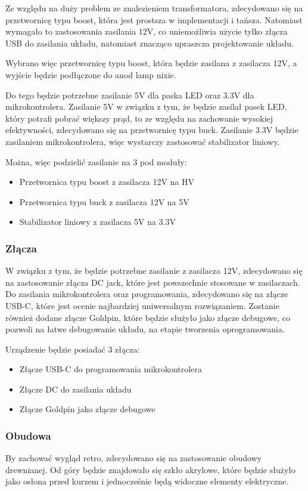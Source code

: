\documentclass[../main.tex]{subfiles}
\begin{document}
Ze względu na duży problem ze znalezieniem transformatora, zdecydowano się na przetwornicę typu boost, która jest prostsza w implementacji i tańsza. Natomiast wymagało
to zastosowania zasilania 12V, co uniemożliwia użycie tylko złącza USB do zasilania układu, natomiast znacząco upraszcza projektowanie układu.

Wybrano więc przetwornicę typu boost, która będzie zasilana z zasilacza 12V, a wyjście będzie podłączone do anod lamp nixie.

Do tego będzie potrzebne zasilanie 5V dla paska LED oraz 3.3V dla mikrokontrolera. Zasilanie 5V w związku z tym, że będzie zasilał pasek LED, który potrafi pobrać większy prąd,
to ze względu na zachowanie wysokiej efektywności, zdecydowano się na przetwornicę typu buck. Zasilanie 3.3V będzie zasilaniem mikrokontrolera, więc wystarczy zastosować
stabilizator liniowy.

Można, więc podzielić zasilanie na 3 pod moduły:
\begin{itemize}
    \item Przetwornica typu boost z zasilacza 12V na HV
    \item Przetwornica typu buck z zasilacza 12V na 5V
    \item Stabilizator liniowy z zasilacza 5V na 3.3V
\end{itemize}

\subsubsection{Złącza}
W związku z tym, że będzie potrzebne zasilanie z zasilacza 12V, zdecydowano się na zastosowanie złącza DC jack, które jest powszechnie stosowane w zasilaczach.
Do zasilania mikrokontrolera oraz programowania, zdecydowano się na złącze USB-C, które jest ocenie najbardziej uniwersalnym rozwiązaniem.
Zostanie również dodane złącze Goldpin, które będzie służyło jako złącze debugowe, co pozwoli na łatwe debugowanie układu, na etapie tworzenia oprogramowania.

Urządzenie będzie posiadać 3 złącza:
\begin{itemize}
    \item Złącze USB-C do programowania mikrokontrolera
    \item Złącze DC do zasilania układu
    \item Złącze Goldpin jako złącze debugowe
\end{itemize}

\subsubsection{Obudowa}
By zachować wygląd retro, zdecydowano się na zastosowanie obudowy drewnianej. Od góry będzie znajdowało się szkło akrylowe, które będzie służyło jako osłona przed kurzem
i jednocześnie będą widoczne elementy elektryczne.
\end{document}
